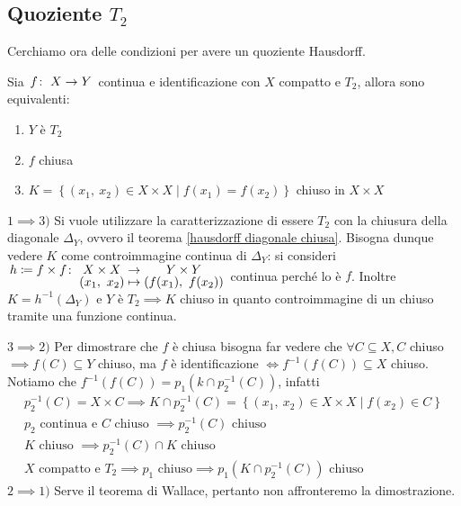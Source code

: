 	\subsection{Quoziente $T_2$}
Cerchiamo ora delle condizioni per avere un quoziente Hausdorff.
\begin{theorema}
	Sia $\funz f X Y$ continua e identificazione con $X$ compatto e $T_2$, allora sono equivalenti:
		\begin{enumerate}
			\item $Y$ è $T_2$
			\item $f$ chiusa
			\item $K=\left\{ (x_1,\ x_2)\in X\times X \mid f(x_1)=f(x_2) \right\}$ chiuso in $X\times X$
		\end{enumerate}
\end{theorema}
\begin{demonstration}
	$1 \implies 3)$  Si vuole utilizzare la caratterizzazione di essere $T_2$ con la chiusura della diagonale $\Delta_Y$, ovvero il teorema \ref{hausdorff diagonale chiusa}. Bisogna dunque vedere $K$ come controimmagine continua di $\Delta_Y$: si consideri	 $\funztot {h\coloneqq f\times f} {X\times X} {Y\times Y} {(x_1,\ x_2)} {\left( f(x_1), \ f(x_2) \right) }$ continua perché lo è $f$. Inoltre $K=h^{-1}(\Delta_Y)$ e $Y$ è $T_2 \implies K$ chiuso in quanto controimmagine di un chiuso tramite una funzione continua.
	$3\implies 2)$ Per dimostrare che $f$ è chiusa bisogna far vedere che $\forall C\subseteq X, C$ chiuso $\implies f(C)\subseteq Y$ chiuso, ma $f$ è identificazione $\iff f^{-1}\left( f(C) \right)\subseteq X$ chiuso. Notiamo che $f^{-1}\left( f(C) \right)= p_1(k\cap p_2^{-1}(C))$, infatti 
		\begin{gather*}
			p_2^{-1}(C)=X\times C \implies K\cap p_2^{-1}(C)= \left\{ (x_1,\ x_2)\in X\times X \mid f(x_2)\in C \right\}\\
			p_2 \text{ continua e $C$ chiuso } \implies p_2^{-1}(C) \text{ chiuso} \\
			K \text{ chiuso }\implies p_2^{-1}(C)\cap K \text{ chiuso}\\
			X \text{ compatto e } T_2 \implies p_1 \text{ chiuso}\implies p_1 \left( K\cap p_2^{-1}(C) \right) \text{ chiuso}
		\end{gather*}
	$2\implies 1)$ Serve il teorema di Wallace, pertanto non affronteremo la dimostrazione.
\end{demonstration}
